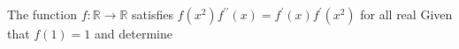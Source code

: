 The function $f : \mathbb{R}\to\mathbb{R}$ satisfies $f(x^2)f^{\prime\prime}(x)=f^\prime (x)f^\prime (x^2)$ for all real   Given that $f(1)=1$ and  determine 